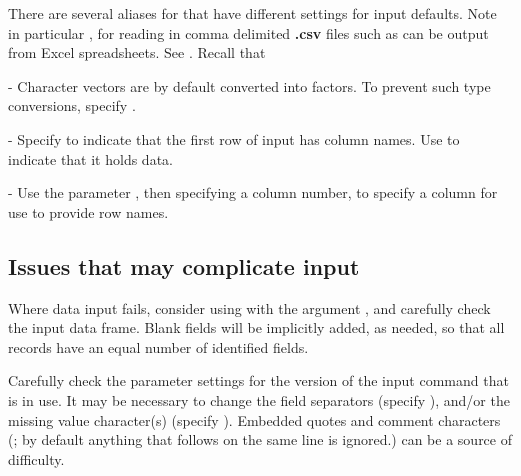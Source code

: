 There are several aliases for  that have different
settings for input defaults. Note in particular ,
for reading in comma delimited {\bf .csv} files such as can be output
from Excel spreadsheets.  See . Recall that


\begin{itemizz}
\item[-] Character vectors are by default converted into factors.  To
  prevent such type conversions, specify
  .

\item[-] Specify  to indicate that the first row
  of input has column names. Use 
  to indicate that it holds data.\newline {}

\item[-] Use the parameter , then specifying a column
number, to specify a column for use to provide row names.
\end{itemizz}

\subsection*{Issues that may complicate input}

Where data input fails, consider using  with the
argument , and carefully check the input data frame.
Blank fields will be implicitly added, as needed, so that all records
have an equal number of identified fields.

Carefully check the parameter settings for the
version of the input command that is in use.  It may be necessary to
change the field separators (specify ), and/or the missing
value character(s) (specify ). Embedded quotes and
comment characters (\txtt{\#}; by default anything that follows
\txtt{\#} on the same line is ignored.) can be a source of difficulty.


